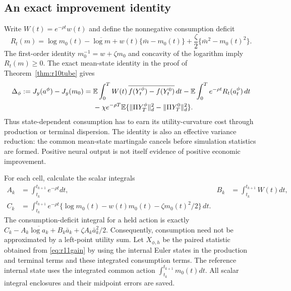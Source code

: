 \subsection{An exact improvement identity}
Write $W(t)=e^{-\rho t}w(t)$ and define the nonnegative consumption deficit
\begin{equation}\label{eq:r11deficit}
 R_t(m)=\log m_0(t)-\overline{\log m}
       +w(t)\{\bar m-m_0(t)\}
       +\frac\zeta2\{\bar m^2-m_0(t)^2\}.
\end{equation}
The first-order identity $m_0^{-1}=w+\zeta m_0$ and concavity of the logarithm imply $R_t(m)\geq0$. The exact mean-state identity in the proof of Theorem~\ref{thm:r10tube} gives
\begin{align}
 \Delta_\phi:=J_y(a^\phi)-J_y(m_0)
 ={}&\mathbb E\int_0^T W(t)\,\overline{f(Y^\phi_t)-f(Y^0_t)}\,dt
       -\mathbb E\int_0^T e^{-\rho t}R_t(a^\phi_t)\,dt\notag\\
 &-\chi e^{-\rho T}\mathbb E\{\|\Pi Y^\phi_T\|_d^2-\|\Pi Y^0_T\|_d^2\}.
 \label{eq:r11gain}
\end{align}
Thus state-dependent consumption has to earn its utility-curvature cost through production or terminal dispersion. The identity is also an effective variance reduction: the common mean-state martingale cancels before simulation statistics are formed. Positive neural output is not itself evidence of positive economic improvement.

For each cell, calculate the scalar integrals
\begin{align*}
 A_k&=\int_{t_k}^{t_{k+1}}e^{-\rho t}dt,&
 B_k&=\int_{t_k}^{t_{k+1}}W(t)dt,\\
 C_k&=\int_{t_k}^{t_{k+1}}e^{-\rho t}
       \{\log m_0(t)-w(t)m_0(t)-\zeta m_0(t)^2/2\}\,dt.
\end{align*}
The consumption-deficit integral for a held action is exactly
$C_k-A_k\overline{\log a_k}+B_k\bar a_k+\zeta A_k\bar a_k^2/2$.
Consequently, consumption need not be approximated by a left-point utility sum. Let $X_{\phi,h}$ be the paired statistic obtained from \eqref{eq:r11gain} by using the internal Euler states in the production and terminal terms and these integrated consumption terms. The reference internal state uses the integrated common action $\int_{t_k}^{t_{k+1}}m_0(t)dt$. All scalar integral enclosures and their midpoint errors are saved.

